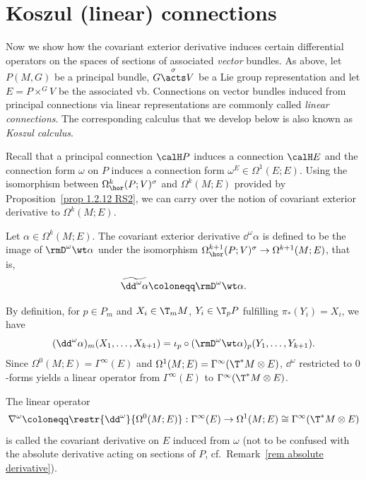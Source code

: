 \section{Koszul (linear) connections}\label{sec: koszul lin connections}

Now we show how the covariant exterior derivative induces certain differential operators on the spaces of sections of associated \emph{vector} bundles. As above, let $P(M,G)$ be a principal bundle, $G\overset{\sigma}{\acts}V$ be a Lie group representation and let $E=P\times^G V$ be the associated \gls{vb}. Connections on vector bundles induced from principal connections via linear representations are commonly called \emph{linear connections}. The corresponding calculus that we develop below is also known as \emph{Koszul calculus}.

Recall that a principal connection $\calH P$ induces a connection $\calH E$ and the connection form $\omega$ on $P$ induces a connection form $\omega^E\in \Omega^1(E;E)$. Using the isomorphism between $\Omega^k_{\hor}(P;V)^\sigma$ and $\Omega^k(M;E)$ provided by Proposition~\ref{prop 1.2.12 RS2}, we can carry over the notion of covariant exterior derivative to $\Omega^k(M;E)$.

\begin{defn}
    Let $\alpha\in\Omega^k(M;E)$. The covariant exterior derivative $\dd^\omega\alpha$ is defined to be the image of $\rmD^\omega\wt\alpha$ under the isomorphism $\Omega^{k+1}_{\hor}(P;V)^\sigma\to \Omega^{k+1}(M;E)$, that is,
    \[\widetilde{\dd^\omega\alpha}\coloneqq \rmD^\omega\wt\alpha.\]
\end{defn}

By definition, for $p\in P_m$ and $X_i\in \T_mM$, $Y_i\in \T_pP$ fulfilling $\pi_\ast(Y_i)=X_i$, we have
\[(\dd^\omega\alpha)_m(X_1,\ldots,X_{k+1})=\iota_p\circ(\rmD^\omega\wt\alpha)_p(Y_1,\ldots,Y_{k+1}).\label{eq 1.5.2 RS2}\]
Since $\Omega^0(M;E)=\Gamma^\infty(E)$ and $\Omega^1(M;E)=\Gamma^\infty(\T^\ast M\otimes E)$, $\dd^\omega$ restricted to $0$-forms yields a linear operator from $\Gamma^\infty(E)$ to $\Gamma^\infty(\T^\ast M\otimes E)$.

\begin{defn}
    The linear operator
    \[\nabla^\omega\coloneqq \restr{\dd^\omega}{\Omega^0(M;E)}:\Gamma^\infty(E)\to \Omega^1(M;E)\cong\Gamma^\infty(\T^\ast M\otimes E)\]
    is called the covariant derivative on $E$ induced from $\omega$ (not to be confused with the absolute derivative acting on sections of $P$, cf.\ Remark~\ref{rem absolute derivative}). 
\end{defn}

